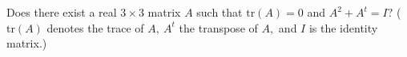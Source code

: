 Does there exist a real $3\times 3$ matrix $A$ such that $\text{tr}(A)=0$ and $A^2+A^t=I?$ ($\text{tr}(A)$ denotes the trace of $A,\ A^t$ the transpose of $A,$ and $I$ is the identity matrix.)

